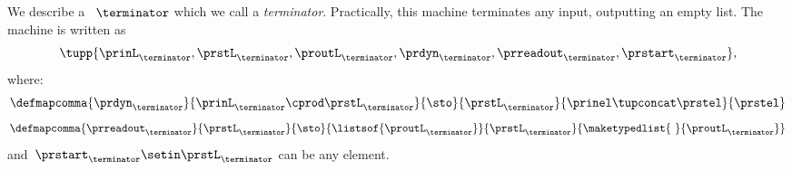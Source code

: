 \begin{example}[Terminator]
    We describe a ~$\terminator$ which we call a \emph{terminator}.
    Practically, this machine terminates any input, outputting an empty list.
    The machine is written as
    \begin{equation}
        \tupp{\prinL_{\terminator},\prstL_{\terminator},\proutL_{\terminator},\prdyn_{\terminator},\prreadout_{\terminator},\prstart_{\terminator}},
    \end{equation}
    where:
    \begin{equation}
        \defmapcomma{\prdyn_\terminator}
        {\prinL_\terminator \cprod \prstL_\terminator}
        {\sto}
        {\prstL_\terminator}
        {\prinel \tupconcat \prstel}
        {\prstel}
    \end{equation}
    \begin{equation}
        \defmapcomma{\prreadout_\terminator}
        {\prstL_\terminator}
        {\sto}
        {\listsof{\proutL_\terminator}}
        {\prstL_\terminator}
        {
            \maketypedlist{ \ }{\proutL_\terminator}
        }
    \end{equation}
    and~$\prstart_\terminator \setin \prstL_\terminator$ can be any element.
\end{example}


